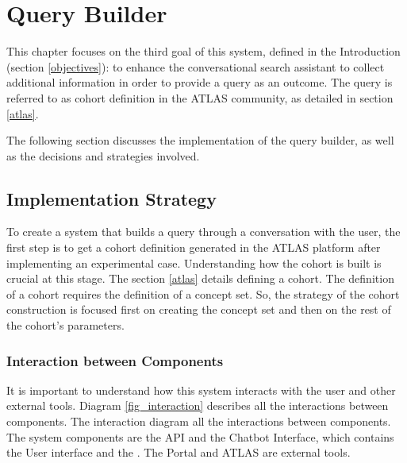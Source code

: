 \chapter{Query Builder}
\label{chapter:QB}

This chapter focuses on the third goal of this system, defined in the Introduction (section \ref{objectives}): to enhance the conversational search assistant to collect additional information in order to provide a query as an outcome. The query is referred to as cohort definition in the ATLAS community, as detailed in section \ref{atlas}.

The following section discusses the implementation of the query builder, as well as the decisions and strategies involved.


\section{Implementation Strategy}


To create a system that builds a query through a conversation with the user, the first step is to get a cohort definition generated in the ATLAS platform after implementing an experimental case. Understanding how the cohort is built is crucial at this stage. The section \ref{atlas} details defining a cohort. The definition of a cohort requires the definition of a concept set. So, the strategy of the cohort construction is focused first on creating the concept set and then on the rest of the cohort's parameters.


\subsection{Interaction between Components}

It is important to understand how this system interacts with the user and other external tools. Diagram \ref{fig_interaction} describes all the interactions between components. The interaction diagram all the interactions between components. The system components are the {\ir} API and the Chatbot Interface, which contains the User interface and the {\llm}. The {\ehden} Portal and ATLAS are external tools.

